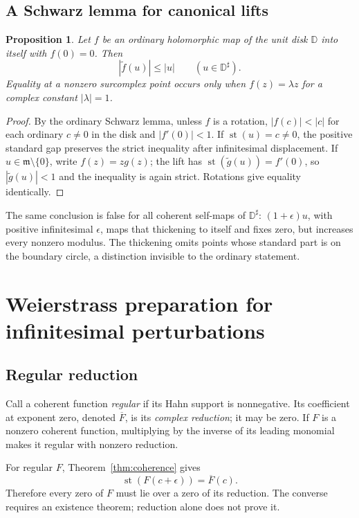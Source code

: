 \documentclass[11pt,a4paper]{article}
\numberwithin{equation}{section}
\newtheorem{proposition}[theorem]{Proposition}
\theoremstyle{definition}
\theoremstyle{remark}
\newcommand{\mm}{\mathfrak m}
\newcommand{\st}{\operatorname{st}}
\begin{document}
\subsection{A Schwarz lemma for canonical lifts}
\begin{proposition}
Let $f$ be an ordinary holomorphic map of the unit disk $\mathbb D$ into itself with $f(0)=0$. Then
\[
 |\widetilde f(u)|\leq|u|\qquad(u\in\mathbb D^\sharp).
\]
Equality at a nonzero surcomplex point occurs only when $f(z)=\lambda z$ for a complex constant $|\lambda|=1$.
\end{proposition}
\begin{proof}
By the ordinary Schwarz lemma, unless $f$ is a rotation, $|f(c)|<|c|$ for each ordinary $c\ne0$ in the disk and $|f'(0)|<1$. If $\st(u)=c\ne0$, the positive standard gap preserves the strict inequality after infinitesimal displacement. If $u\in\mm\setminus\{0\}$, write $f(z)=zg(z)$; the lift has $\st(\widetilde g(u))=f'(0)$, so $|\widetilde g(u)|<1$ and the inequality is again strict. Rotations give equality identically.
\end{proof}
The same conclusion is false for all coherent self-maps of $\mathbb D^\sharp$: $(1+\epsilon)u$, with positive infinitesimal $\epsilon$, maps that thickening to itself and fixes zero, but increases every nonzero modulus. The thickening omits points whose standard part is on the boundary circle, a distinction invisible to the ordinary statement.

\section{Weierstrass preparation for infinitesimal perturbations}
\label{sec:prep}
\subsection{Regular reduction}
Call a coherent function \emph{regular} if its Hahn support is nonnegative. Its coefficient at exponent zero, denoted $\overline F$, is its \emph{complex reduction}; it may be zero. If $F$ is a nonzero coherent function, multiplying by the inverse of its leading monomial makes it regular with nonzero reduction.

For regular $F$, Theorem~\ref{thm:coherence} gives
\[
 \st(F(c+\epsilon))=\overline F(c).
\]
Therefore every zero of $F$ must lie over a zero of its reduction. The converse requires an existence theorem; reduction alone does not prove it.
\end{document}
